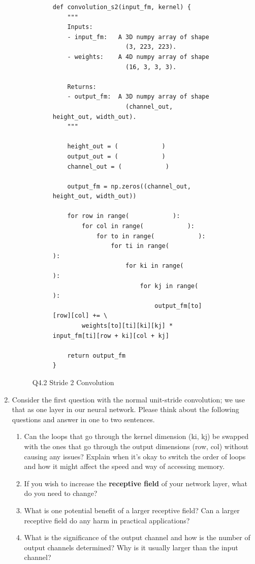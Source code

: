 \documentclass[12pt]{article}
\begin{document}
\begin{enumerate}
\begin{figure}[h!]
\hspace{3em}
\begin{subfigure}[b]{0.8\textwidth}
    \begin{verbatim}
def convolution_s2(input_fm, kernel) {
    """
    Inputs:
    - input_fm:   A 3D numpy array of shape 
                    (3, 223, 223).
    - weights:    A 4D numpy array of shape 
                    (16, 3, 3, 3).
    
    Returns:
    - output_fm:  A 3D numpy array of shape 
                    (channel_out, height_out, width_out).
    """

    height_out = (            )
    output_out = (            )
    channel_out = (            )

    output_fm = np.zeros((channel_out, height_out, width_out))
    
    for row in range(            ):
        for col in range(            ):
            for to in range(            ):
                for ti in range(            ):
                    for ki in range(            ):
                        for kj in range(            ):
                            output_fm[to][row][col] += \
        weights[to][ti][ki][kj] * input_fm[ti][row + ki][col + kj]

    return output_fm
}
    \end{verbatim}
\end{subfigure}
\caption{Q4.2 Stride 2 Convolution}
\end{figure}

\item Consider the first question with the normal unit-stride convolution; we use that as one layer in our neural network. Please think about the following questions and answer in one to two sentences.
\begin{enumerate}
    \item Can the loops that go through the kernel dimension (ki, kj) be swapped with the ones that go through the output dimensions (row, col) without causing any issues? Explain when it's okay to switch the order of loops and how it might affect the speed and way of accessing memory. \\
    
    \item If you wish to increase the \textbf{receptive field} of your network layer, what do you need to change? \\
    
    \item What is one potential benefit of a larger receptive field? Can a larger receptive field do any harm in practical applications? \\

    \item What is the significance of the output channel and how is the number of output channels determined? Why is it usually larger than the input channel? \\
\end{enumerate}

\end{enumerate}
\newpage
\end{document}
